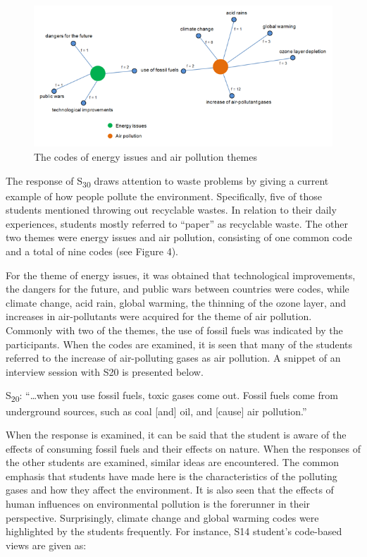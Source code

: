 \documentclass[11.5pt]{sig-alternate} %
\begin{document}
\begin{large}
\begin{figure}[tp]
    \centering
    \includegraphics[width=1\textwidth]{Fig4.png}
    \caption{The codes of energy issues and air pollution themes}
\end{figure}

The response of S\textsubscript{30} draws attention to waste problems by giving a current example of how people pollute the environment. Specifically, five of those students mentioned throwing out recyclable wastes. In relation to their daily experiences, students mostly referred to “paper” as recyclable waste. The other two themes were energy issues and air pollution, consisting of one common code and a total of nine codes (see Figure 4). 

For the theme of energy issues, it was obtained that technological improvements, the dangers for the future, and public wars between countries were codes, while climate change, acid rain, global warming, the thinning of the ozone layer, and increases in air-pollutants were acquired for the theme of air pollution. Commonly with two of the themes, the use of fossil fuels was indicated by the participants. When the codes are examined, it is seen that many of the students referred to the increase of air-polluting gases as air pollution. A snippet of an interview session with S20 is presented below.

S\textsubscript{20}: “…when you use fossil fuels, toxic gases come out. Fossil fuels come from underground sources, such as coal [and] oil, and [cause] air pollution.”

When the response is examined, it can be said that the student is aware of the effects of consuming fossil fuels and their effects on nature. When the responses of the other students are examined, similar ideas are encountered. The common emphasis that students have made here is the characteristics of the polluting gases and how they affect the environment. It is also seen that the effects of human influences on environmental pollution is the forerunner in their perspective. Surprisingly, climate change and global warming codes were highlighted by the students frequently. For instance, S14 student’s code-based views are given as:


\end{large}
\end{document}
